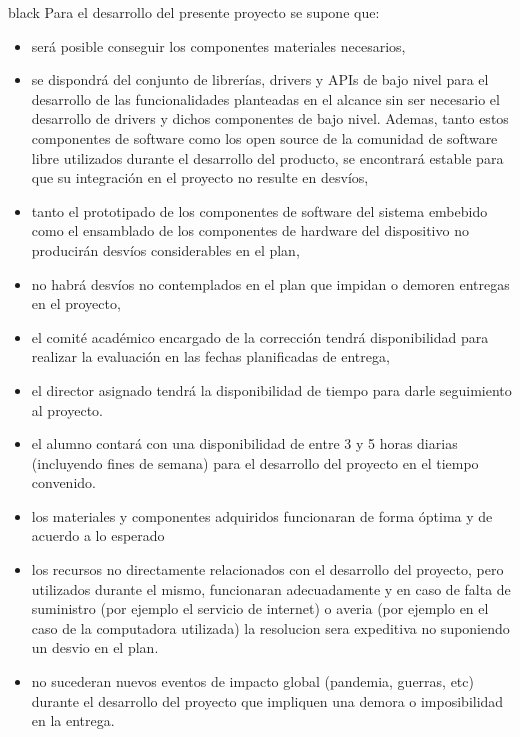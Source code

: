 \documentclass[
11pt, %
]{charter}
\begin{document}
\begin{consigna}{black}
Para el desarrollo del presente proyecto se supone que: 

\begin{itemize}
	\item será posible conseguir los componentes materiales necesarios,
	\item se dispondrá del conjunto de librerías, drivers y APIs de bajo nivel para el desarrollo de las funcionalidades planteadas en el alcance sin ser necesario el desarrollo de drivers y dichos componentes de bajo nivel. Ademas, tanto estos componentes de software como los open source de la comunidad de software libre utilizados durante el desarrollo del producto, se encontrará estable para que su integración en el proyecto no resulte en desvíos,	
	\item tanto el prototipado de los componentes de software del sistema embebido como el ensamblado de los componentes de hardware del dispositivo no producirán desvíos considerables en el plan,
	\item no habrá desvíos no contemplados en el plan que impidan o demoren entregas en el proyecto,
	\item el comité académico encargado de la corrección tendrá disponibilidad para realizar la evaluación en las fechas planificadas de entrega,
	\item el director asignado tendrá la disponibilidad de tiempo para darle seguimiento al proyecto.
	\item el alumno contará con una disponibilidad de entre 3 y 5 horas diarias (incluyendo fines de semana) para el desarrollo del proyecto en el tiempo convenido.
	\item los materiales y componentes adquiridos funcionaran de forma óptima y de acuerdo a lo esperado
	\item los recursos no directamente relacionados con el desarrollo del proyecto, pero utilizados durante el mismo, funcionaran adecuadamente y en caso de falta de suministro (por ejemplo el servicio de internet) o averia (por ejemplo en el caso de la computadora utilizada) la resolucion sera expeditiva no suponiendo un desvio en el plan.
	\item no sucederan nuevos eventos de impacto global (pandemia, guerras, etc) durante el desarrollo del proyecto que impliquen una demora o imposibilidad en la entrega.
\end{itemize}


\end{consigna}
\end{document}
